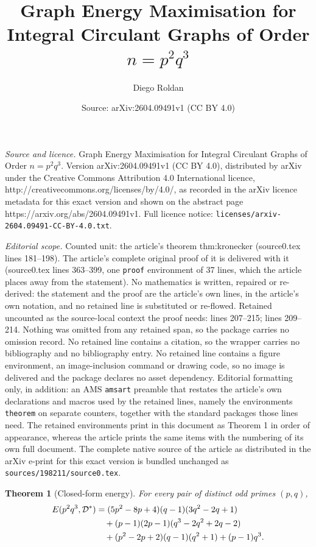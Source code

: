 \documentclass[10pt,a4paper]{amsart}
\title{Graph Energy Maximisation for Integral Circulant Graphs of Order $n = p^2q^3$}
\author{Diego Roldan}
\date{Source: arXiv:2604.09491v1 (CC BY 4.0)}
\newtheorem{theorem}{Theorem}
\newcommand{\Dstar}{\mathcal{D}^*}
\begin{document}
\maketitle

\noindent\emph{Source and licence.} Graph Energy Maximisation for Integral Circulant Graphs of Order $n = p^2q^3$. Version arXiv:2604.09491v1 (CC BY 4.0), distributed by arXiv under the Creative Commons Attribution 4.0 International licence, http://creativecommons.org/licenses/by/4.0/, as recorded in the arXiv licence metadata for this exact version and shown on the abstract page https://arxiv.org/abs/2604.09491v1. Full licence notice: \texttt{licenses/arxiv-2604.09491-CC-BY-4.0.txt}.\par\smallskip

\noindent\textit{Editorial scope.} Counted unit: the article's theorem thm:kronecker (source0.tex lines 181--198). The article's complete original proof of it is delivered with it (source0.tex lines 363--399, one \texttt{proof} environment of 37 lines, which the article places away from the statement). No mathematics is written, repaired or re-derived: the statement and the proof are the article's own lines, in the article's own notation, and no retained line is substituted or re-flowed.  Retained uncounted as the source-local context the proof needs: lines 207--215; lines 209--214.  Nothing was omitted from any retained span, so the package carries no omission record.  No retained line contains a citation, so the wrapper carries no bibliography and no bibliography entry.  No retained line contains a figure environment, an image-inclusion command or drawing code, so no image is delivered and the package declares no asset dependency.  Editorial formatting only, in addition: an AMS \texttt{amsart} preamble that restates the article's own declarations and macros used by the retained lines, namely the environments \texttt{theorem} on separate counters, together with the standard packages those lines need.  The retained environments print in this document as Theorem 1 in order of appearance, whereas the article prints the same items with the numbering of its own full document.  The complete native source of the article as distributed in the arXiv e-print for this exact version is bundled unchanged as \texttt{sources/198211/source0.tex}.
\begin{theorem}[Closed-form energy]\label{thm:formula}
For every pair of distinct odd primes $(p,q)$,
\begin{align}
  E(p^2q^3,\Dstar)
  &= (5p^2-8p+4)(q-1)(3q^2-2q+1) \notag\\
  &\quad + (p-1)(2p-1)(q^3-2q^2+2q-2) \label{eq:Emax}\\
  &\quad + (p^2-2p+2)(q-1)(q^2+1)+(p-1)q^3. \notag
\end{align}
\end{theorem}
\end{document}

